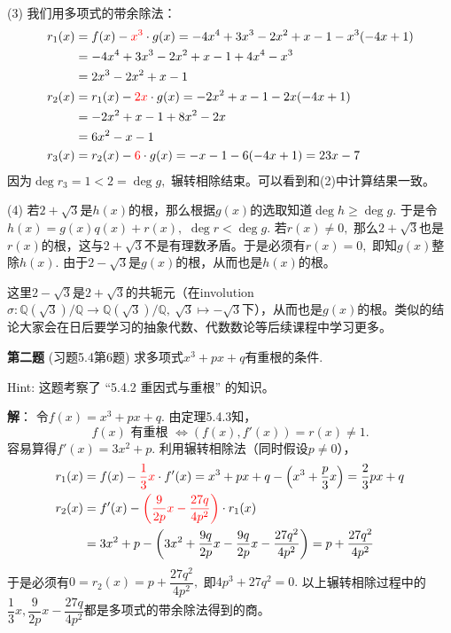 \vspace{0.5em}

(3) 我们用多项式的带余除法：
\begin{align*}
r_1(x) & = f(x) - {\color{red} x^3} \cdot g(x) = - 4x^4 + 3x^3 - 2x^2 + x - 1 - x^3 (- 4x + 1) \\
& = - 4x^4 + 3x^3 - 2x^2 + x - 1 + 4x^4 - x^3 \\
& = 2x^3 - 2x^2 + x - 1 \\
r_2(x) & = r_1(x) - {\color{red} 2x} \cdot g(x) = - 2x^2 + x - 1 - 2x (- 4x + 1) \\
& = - 2x^2 + x - 1 + 8x^2 - 2x \\
& = 6x^2 - x - 1 \\
r_3(x) & = r_2(x) - {\color{red} 6} \cdot g(x) = - x - 1 - 6 (- 4x + 1) = 23 x - 7
\end{align*}
因为$\deg r_3 = 1 < 2 = \deg g,$ 辗转相除结束。可以看到和(2)中计算结果一致。

\vspace{0.5em}

(4) 若$2 + \sqrt{3}$是$h(x)$的根，那么根据$g(x)$的选取知道$\deg h \geqslant \deg g.$ 于是令$h(x) = g(x) q(x) + r(x),$ $\deg r < \deg g.$ 若$r(x) \neq 0,$ 那么$2 + \sqrt{3}$也是$r(x)$的根，这与$2 + \sqrt{3}$不是有理数矛盾。于是必须有$r(x) = 0,$ 即知$g(x)$整除$h(x).$ 由于$2 - \sqrt{3}$是$g(x)$的根，从而也是$h(x)$的根。

这里$2 - \sqrt{3}$是$2 + \sqrt{3}$的共轭元（在involution $\sigma: \mathbb{Q}(\sqrt{3}) / \mathbb{Q} \to \mathbb{Q}(\sqrt{3}) / \mathbb{Q}, ~ \sqrt{3} \mapsto -\sqrt{3}$下），从而也是$g(x)$的根。类似的结论大家会在日后要学习的抽象代数、代数数论等后续课程中学习更多。

\fi  %

\newpageorvspace

{\bf 第二题} (习题5.4第6题) 求多项式$x^3 + px + q$有重根的条件.

Hint: 这题考察了 ``5.4.2 重因式与重根'' 的知识。

\ifIncludeAnswer

\newpageorvspace

{\bf 解}： 令$f(x) = x^3 + px + q.$ 由定理5.4.3知，
$$f(x) \text{ 有重根 } \Longleftrightarrow \left( f(x), f'(x) \right) = r(x) \neq 1.$$
容易算得$f'(x) = 3x^2 + p.$ 利用辗转相除法（同时假设$p\neq 0$），
\begin{align*}
r_1(x) & = f(x) - {\color{red} \dfrac{1}{3}x} \cdot f'(x) = x^3 + px + q - \left( x^3 + \dfrac{p}{3}x \right) = \dfrac{2}{3}px + q \\
r_2(x) & = f'(x) - {\color{red} \left( \dfrac{9}{2p}x - \dfrac{27q}{4p^2} \right)} \cdot r_1(x) \\
& = 3x^2 + p - \left( 3x^2 + \dfrac{9q}{2p}x - \dfrac{9q}{2p}x - \dfrac{27q^2}{4p^2} \right) = p + \dfrac{27q^2}{4p^2}
\end{align*}
于是必须有$0 = r_2(x) = p + \dfrac{27q^2}{4p^2},$ 即$4p^3 + 27q^2 = 0.$ 以上辗转相除过程中的$\dfrac{1}{3}x, \dfrac{9}{2p}x - \dfrac{27q}{4p^2}$都是多项式的带余除法得到的商。

